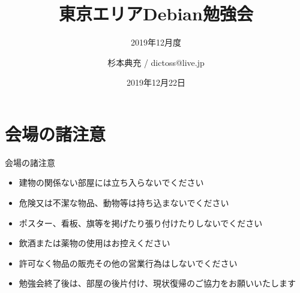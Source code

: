 \title{東京エリアDebian勉強会}
\subtitle{2019年12月度} %
\author{杉本典充 / dictoss@live.jp}
\date{2019年12月22日}



\begin{frame}
\titlepage{}
\end{frame}

\section{会場の諸注意}

\begin{frame}{会場の諸注意}
\begin{itemize}
\item 建物の関係ない部屋には立ち入らないでください
\item 危険又は不潔な物品、動物等は持ち込まないでください
\item ポスター、看板、旗等を掲げたり張り付けたりしないでください
\item 飲酒または薬物の使用はお控えください
\item 許可なく物品の販売その他の営業行為はしないでください
\item 勉強会終了後は、部屋の後片付け、現状復帰のご協力をお願いいたします
\end{itemize} 
\end{frame}

